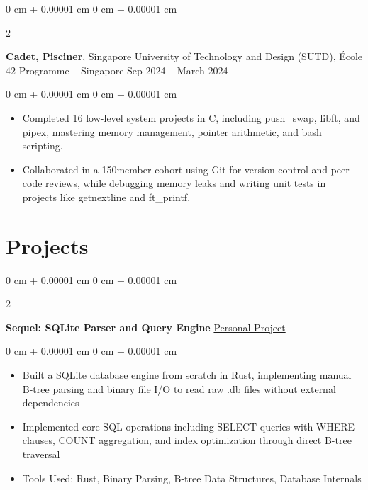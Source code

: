 \documentclass[10pt, letterpaper]{article}
\newenvironment{highlights}{
    \begin{itemize}[
        topsep=0.10 cm,
        parsep=0.10 cm,
        partopsep=0pt,
        itemsep=0pt,
        leftmargin=0 cm + 10pt
    ]
}{
    \end{itemize}
} %
\newenvironment{onecolentry}{
    \begin{adjustwidth}{
        0 cm + 0.00001 cm
    }{
        0 cm + 0.00001 cm
    }
}{
    \end{adjustwidth}
} %
\newenvironment{twocolentry}[2][]{
    \onecolentry
    \def\secondColumn{#2}
    \setcolumnwidth{\fill, 4.5 cm}
    \begin{paracol}{2}
}{
    \switchcolumn \raggedleft \secondColumn
    \end{paracol}
    \endonecolentry
} %
\begin{document}
                \vspace{0.2 cm}
                
                \begin{twocolentry}{
                    Sep 2024 – March 2024
                }
                    \textbf{Cadet, Pisciner}, Singapore University of Technology and Design (SUTD), École 42 Programme -- Singapore\end{twocolentry}
                \vspace{0.10 cm}
                \begin{onecolentry}
                    \begin{highlights}
                        \item Completed 16 low-level system projects in C, including push\_swap, libft, and pipex, mastering memory management, pointer arithmetic, and bash scripting.
                        \item Collaborated in a 150\-member cohort using Git for version control and peer code reviews, while debugging memory leaks and writing unit tests in projects like getnextline and ft\_printf.
                    \end{highlights}
                \end{onecolentry}
        
                \vspace{0.2 cm}
    
        \section{Projects}
        
        \begin{twocolentry}{
            \href{https://github.com/yuann3/sequel/}{Personal Project}
        }
            \textbf{Sequel: SQLite Parser and Query Engine}\end{twocolentry}

        \vspace{0.10 cm}
        \begin{onecolentry}
            \begin{highlights}
                \item Built a SQLite database engine from scratch in Rust, implementing manual B-tree parsing and binary file I/O to read raw .db files without external dependencies
                \item Implemented core SQL operations including SELECT queries with WHERE clauses, COUNT aggregation, and index optimization through direct B-tree traversal
                \item Tools Used: Rust, Binary Parsing, B-tree Data Structures, Database Internals
            \end{highlights}
        \end{onecolentry}
\end{document}
